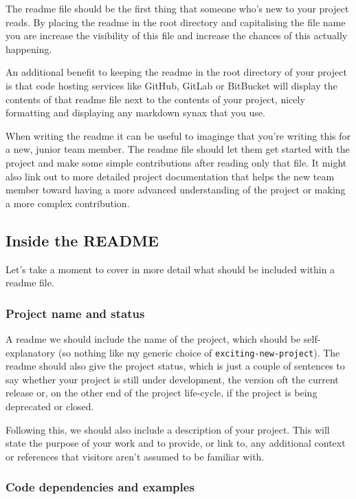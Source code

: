 \documentclass[
  letterpaper,
  DIV=11,
  numbers=noendperiod]{scrreprt}
\begin{document}
The readme file should be the first thing that someone who's new to your
project reads. By placing the readme in the root directory and
capitalising the file name you are increase the visibility of this file
and increase the chances of this actually happening.

An additional benefit to keeping the readme in the root directory of
your project is that code hosting services like GitHub, GitLab or
BitBucket will display the contents of that readme file next to the
contents of your project, nicely formatting and displaying any markdown
synax that you use.

When writing the readme it can be useful to imaginge that you're writing
this for a new, junior team member. The readme file should let them get
started with the project and make some simple contributions after
reading only that file. It might also link out to more detailed project
documentation that helps the new team member toward having a more
advanced understanding of the project or making a more complex
contribution.

\subsection{Inside the README}\label{inside-the-readme}

Let's take a moment to cover in more detail what should be included
within a readme file.

\subsubsection{Project name and status}\label{project-name-and-status}

A readme we should include the name of the project, which should be
self-explanatory (so nothing like my generic choice of
\texttt{exciting-new-project}). The readme should also give the project
status, which is just a couple of sentences to say whether your project
is still under development, the version oft the current release or, on
the other end of the project life-cycle, if the project is being
deprecated or closed.

Following this, we should also include a description of your project.
This will state the purpose of your work and to provide, or link to, any
additional context or references that visitors aren't assumed to be
familiar with.

\subsubsection{Code dependencies and
examples}\label{code-dependencies-and-examples}
\end{document}
